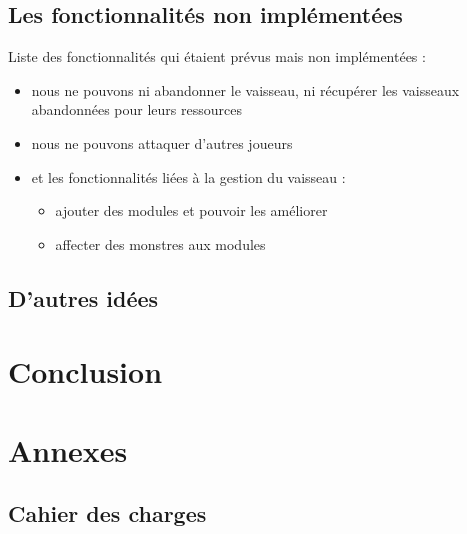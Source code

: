 \documentclass[a4paper,11pt]{report}
\begin{document}
  \section{Les fonctionnalités non implémentées}
    Liste des fonctionnalités qui étaient prévus mais non implémentées :
    \begin{itemize}
      \item nous ne pouvons ni abandonner le vaisseau, ni récupérer les vaisseaux abandonnées pour leurs ressources
      \item nous ne pouvons attaquer d'autres joueurs
      \item et les fonctionnalités liées à la gestion du vaisseau :
      \begin{itemize}
        \item ajouter des modules et pouvoir les améliorer
        \item affecter des monstres aux modules
      \end{itemize}
    \end{itemize}

  \section{D'autres idées}

\chapter{Conclusion}

\chapter{Annexes}

  \section{Cahier des charges}
    
\end{document}
